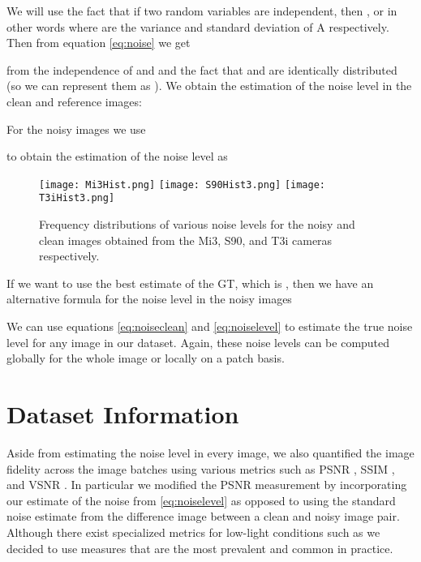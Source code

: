 \documentclass[review]{elsarticle}
\begin{document}
We will use the fact that if two random variables  are independent, then , or in other words  where  are the variance and standard deviation of A respectively.
Then  from equation \eqref{eq:noise} we get

from the independence of  and  and the fact that  and  are identically distributed (so we can represent them as ). We obtain the estimation of the noise level in the clean and reference images:


For the noisy images we use 

to obtain the estimation of the noise level as

\begin{figure*}[t]
\centering
\hspace{-3mm}\texttt{[image: Mi3Hist.png]}
\hspace{-3mm}\texttt{[image: S90Hist3.png]}
\hspace{-3mm}\texttt{[image: T3iHist3.png]}
\vskip -4mm
\caption{Frequency distributions of various noise levels for the noisy and clean images obtained from the Mi3, S90, and T3i  cameras respectively. }
\label{fig:hists}
\vspace {-4mm}
\end{figure*}



If we want to use the best estimate of the GT, which is , then we have an alternative formula for the noise level in the noisy images


We can use equations \eqref{eq:noiseclean} and \eqref{eq:noiselevel} to estimate the true noise level for any image in our dataset. Again, these noise levels can be computed globally for the whole image or locally on a patch basis.





\section{Dataset Information}


Aside from estimating the noise level in every image, we also quantified the image fidelity across the image batches using various metrics such as PSNR \cite{perceptualdistortion}, SSIM \cite{ssim}, and VSNR \cite{vsnr}. In particular we modified the PSNR measurement by incorporating our estimate of the noise from \eqref{eq:noiselevel} as opposed to using the standard noise estimate from the difference image between a clean and noisy image pair.  Although there exist specialized metrics for low-light conditions such as \cite{similaritylowlight} we decided to use measures that are the most prevalent and common in practice.
\end{document}
